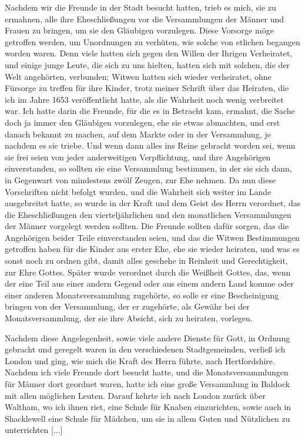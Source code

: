 Nachdem wir die Freunde in der Stadt besucht hatten, trieb
es mich, sie zu ermahnen, alle ihre Eheschließungen vor die 
Versammlungen der Männer und Frauen zu bringen, um sie den
Gläubigen vorzulegen. Diese Vorsorge möge getroffen werden,
um Unordnungen zu verhüten, wie solche von etlichen begangen
worden waren. Denn viele hatten sich gegen den Willen der
Ihrigen Verheiratet, und einige junge Leute, die sich zu uns hielten,
hatten sich mit solchen, die der Welt angehörten, verbunden;
Witwen hatten sich wieder verheiratet, ohne Fürsorge zu treffen
für ihre Kinder, trotz meiner Schrift über das Heiraten, die ich
im Jahre 1653 veröffentlicht hatte, als die Wahrheit noch wenig
verbreitet war. Ich hatte darin die Freunde, für die es in
Betracht kam, ermahnt, die Sache doch ja immer den Gläubigen
vorzulegen, ehe sie etwas abmachten, und erst danach bekannt
zu machen, auf dem Markte oder in der Versammlung, je nachdem 
es sie triebe. Und wenn dann alles ins Reine gebracht
worden sei, wenn sie frei seien von jeder anderweitigen 
Verpflichtung, und ihre Angehörigen einverstanden, so sollten sie eine 
Versammlung bestimmen, in der sie sich dann, in Gegenwart von
mindestens zwölf Zeugen, zur Ehe nehmen. Da nun diese Vorschriften
nicht befolgt wurden, und die Wahrheit sich weiter im Lande
ausgebreitet hatte, so wurde in der Kraft und dem Geist des
Herrn verordnet, das die Eheschließungen den vierteljährlichen
und den monatlichen Versammlungen der Männer vorgelegt werden
sollten. Die Freunde sollten dafür sorgen, das die Angehörigen
beider Teile einverstanden seien, und das die Witwen Bestimmungen
getroffen haben für die Kinder aus erster Ehe, ehe sie wieder
heiraten, und was es sonst noch zu ordnen gibt, damit alles 
geschehe in Reinheit und Gerechtigkeit, zur Ehre Gottes. Später
wurde verordnet durch die Weißheit Gottes, das, wenn der eine
Teil aus einer andern Gegend oder aus einem andern Land komme
oder einer anderen Monatsversammlung zugehörte, so solle er eine
Bescheinigung bringen von der Versammlung, der er zugehörte,
als Gewähr bei der Monatsversammlung, der sie ihre Absicht,
sich zu heiraten, vorlegen.

Nachdem diese Angelegenheit, sowie viele andere Dienste für
Gott, in Ordnung gebracht und geregelt waren in den 
verschiedenen Stadtgemeinden, verließ ich London und ging, wie mich
die Kraft des Herrn führte, nach Hertfordshire. Nachdem ich
viele Freunde dort besucht hatte, und die Monatsversammlungen
für Männer dort geordnet waren, hatte ich eine große 
Versammlung in Baldock mit allen möglichen Leuten. Darauf kehrte ich
nach London zurück über Waltham, wo ich ihnen riet, eine Schule
für Knaben einzurichten, sowie auch in Shacklewell eine Schule
für Mädchen, um sie in allem Guten und Nützlichen zu unterrichten [...]

